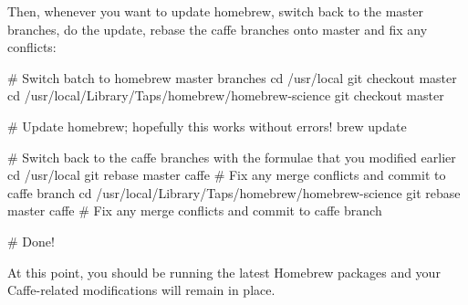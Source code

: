 Then, whenever you want to update homebrew, switch back to the master branches, do the update, rebase the caffe branches onto master and fix any conflicts\+: \begin{DoxyVerb}# Switch batch to homebrew master branches
cd /usr/local
git checkout master
cd /usr/local/Library/Taps/homebrew/homebrew-science
git checkout master

# Update homebrew; hopefully this works without errors!
brew update

# Switch back to the caffe branches with the formulae that you modified earlier
cd /usr/local
git rebase master caffe
# Fix any merge conflicts and commit to caffe branch
cd /usr/local/Library/Taps/homebrew/homebrew-science
git rebase master caffe
# Fix any merge conflicts and commit to caffe branch

# Done!
\end{DoxyVerb}


At this point, you should be running the latest Homebrew packages and your Caffe-\/related modifications will remain in place. 